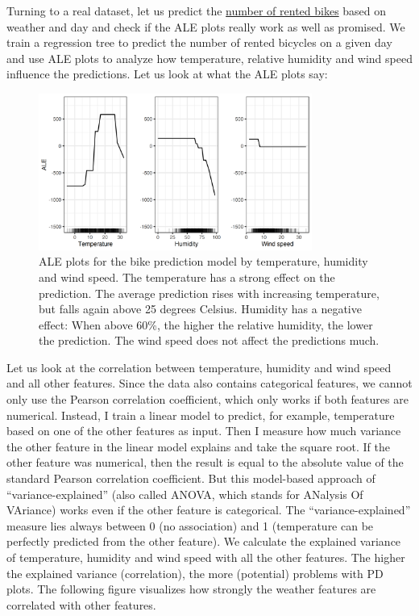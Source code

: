\documentclass[
  10pt,
]{scrbook}
\begin{document}
Turning to a real dataset, let us predict the \protect\hyperlink{bike-data}{number of rented bikes} based on weather and day and check if the ALE plots really work as well as promised.
We train a regression tree to predict the number of rented bicycles on a given day and use ALE plots to analyze how temperature, relative humidity and wind speed influence the predictions.
Let us look at what the ALE plots say:

\begin{figure}

{\centering \includegraphics[width=0.8\textwidth]{images/ale-bike-1} 

}

\caption{ALE plots for the bike prediction model by temperature, humidity and wind speed. The temperature has a strong effect on the prediction. The average prediction rises with increasing temperature, but falls again above 25 degrees Celsius. Humidity has a negative effect: When above 60\%, the higher the relative humidity, the lower the prediction. The wind speed does not affect the predictions much.}\label{fig:ale-bike}
\end{figure}

Let us look at the correlation between temperature, humidity and wind speed and all other features.
Since the data also contains categorical features, we cannot only use the Pearson correlation coefficient, which only works if both features are numerical.
Instead, I train a linear model to predict, for example, temperature based on one of the other features as input.
Then I measure how much variance the other feature in the linear model explains and take the square root.
If the other feature was numerical, then the result is equal to the absolute value of the standard Pearson correlation coefficient.
But this model-based approach of ``variance-explained'' (also called ANOVA, which stands for ANalysis Of VAriance) works even if the other feature is categorical.
The ``variance-explained'' measure lies always between 0 (no association) and 1 (temperature can be perfectly predicted from the other feature).
We calculate the explained variance of temperature, humidity and wind speed with all the other features.
The higher the explained variance (correlation), the more (potential) problems with PD plots.
The following figure visualizes how strongly the weather features are correlated with other features.
\end{document}
